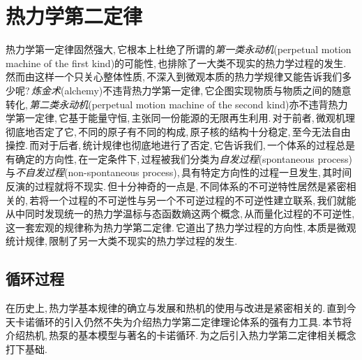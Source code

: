 \chapter{热力学第二定律}


热力学第一定律固然强大,\,它根本上杜绝了所谓的\emph{第一类永动机}(perpetual motion machine of the first kind)的可能性,\,也排除了一大类不现实的热力学过程的发生.\,然而由这样一个只关心整体性质,\,不深入到微观本质的热力学规律又能告诉我们多少呢?\,\emph{炼金术}(alchemy)不违背热力学第一定律,\,它企图实现物质与物质之间的随意转化,\,\emph{第二类永动机}(perpetual motion machine of the second kind)亦不违背热力学第一定律,\,它基于能量守恒,\,主张同一份能源的无限再生利用.\,对于前者,\,微观机理彻底地否定了它,\,不同的原子有不同的构成,\,原子核的结构十分稳定,\,至今无法自由操控.\,而对于后者,\,统计规律也彻底地进行了否定,\,它告诉我们,\,一个体系的过程总是有确定的方向性,\,在一定条件下,\,过程被我们分类为\emph{自发过程}(spontaneous process)与\emph{不自发过程}(non-spontaneous process),\,具有特定方向性的过程一旦发生,\,其时间反演的过程就将不现实.\,但十分神奇的一点是,\,不同体系的不可逆特性居然是紧密相关的,\,若将一个过程的不可逆性与另一个不可逆过程的不可逆性建立联系,\,我们就能从中同时发现统一的热力学温标与态函数熵这两个概念,\,从而量化过程的不可逆性,\,这一套宏观的规律称为热力学第二定律.\,它道出了热力学过程的方向性,\,本质是微观统计规律,\,限制了另一大类不现实的热力学过程的发生.


\section{循环过程}
在历史上,\,热力学基本规律的确立与发展和热机的使用与改进是紧密相关的.\,直到今天卡诺循环的引入仍然不失为介绍热力学第二定律理论体系的强有力工具.\,本节将介绍热机,\,热泵的基本模型与著名的卡诺循环.\,为之后引入热力学第二定律相关概念打下基础.

